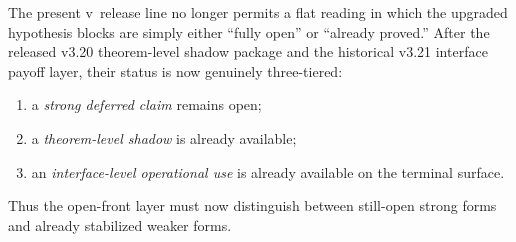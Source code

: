 \begin{remark}
\label{rem:v321-synchronized-status-reading-upgraded-hypothesis-layer}
The present v\docversion\ release line no longer permits a flat reading in which the upgraded hypothesis blocks are simply either ``fully open'' or ``already proved.'' After the released v3.20 theorem-level shadow package and the historical v3.21 interface payoff layer, their status is now genuinely three-tiered:
\begin{enumerate}[leftmargin=2em,label=(\roman*)]
  \item a \emph{strong deferred claim} remains open;
  \item a \emph{theorem-level shadow} is already available;
  \item an \emph{interface-level operational use} is already available on the terminal surface.
\end{enumerate}
Thus the open-front layer must now distinguish between still-open strong forms and already stabilized weaker forms.
\end{remark}


